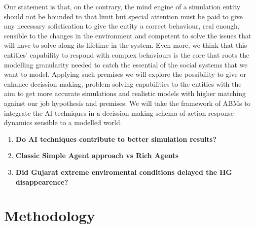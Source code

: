 \documentclass[11pt,oneside,a4paper,openright]{report}
\begin{document}
Our statement is that, on the contrary, the mind engine of a simulation entity should not be bounded to that limit but special attention must be paid to give any necessary sofistication to give the entity a correct behaviour, real enough, sensible to the changes in the environment and competent to solve the issues that will have to solve along its lifetime in the system. Even more, we think that this entities' capability to respond with complex behaviours is the core that roots the modelling granularity needed to catch the essential of the social systems that we want to model.
Applying such premises we will explore the possibility to give or enhance decission making, problem solving
capabilities to the entities with the aim to get more accurate simulations and realistic models with higher matching against our job hypothesis and premises. We will take the framework of ABMs to integrate the AI techniques in a decission making schema of action-response dynamics sensible to a modelled world.


\begin{enumerate}
 \item \indent \textbf{Do AI techniques contribute to better simulation results?}
 \item \indent \textbf{Classic Simple Agent approach vs Rich Agents}
 \item \indent \textbf{Did Gujarat extreme enviromental conditions delayed the HG disappearence?}
\end{enumerate}

\newpage 




\chapter{Methodology}

\end{document}
